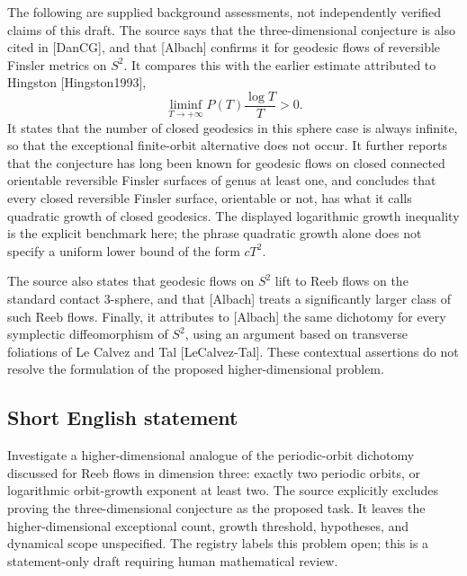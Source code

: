 \documentclass[11pt]{article}
\begin{document}
The following are supplied background assessments, not independently verified claims of this draft. The source says that the three-dimensional conjecture is also cited in [DanCG], and that [Albach] confirms it for geodesic flows of reversible Finsler metrics on \(S^2\). It compares this with the earlier estimate attributed to Hingston [Hingston1993],
\[
\liminf_{T\to+\infty}P(T)\frac{\log T}{T}>0.
\]
It states that the number of closed geodesics in this sphere case is always infinite, so that the exceptional finite-orbit alternative does not occur. It further reports that the conjecture has long been known for geodesic flows on closed connected orientable reversible Finsler surfaces of genus at least one, and concludes that every closed reversible Finsler surface, orientable or not, has what it calls quadratic growth of closed geodesics. The displayed logarithmic growth inequality is the explicit benchmark here; the phrase quadratic growth alone does not specify a uniform lower bound of the form \(cT^2\).

The source also states that geodesic flows on \(S^2\) lift to Reeb flows on the standard contact \(3\)-sphere, and that [Albach] treats a significantly larger class of such Reeb flows. Finally, it attributes to [Albach] the same dichotomy for every symplectic diffeomorphism of \(S^2\), using an argument based on transverse foliations of Le Calvez and Tal [LeCalvez-Tal]. These contextual assertions do not resolve the formulation of the proposed higher-dimensional problem.
\subsection{Short English statement}
Investigate a higher-dimensional analogue of the periodic-orbit dichotomy discussed for Reeb flows in dimension three: exactly two periodic orbits, or logarithmic orbit-growth exponent at least two. The source explicitly excludes proving the three-dimensional conjecture as the proposed task. It leaves the higher-dimensional exceptional count, growth threshold, hypotheses, and dynamical scope unspecified. The registry labels this problem open; this is a statement-only draft requiring human mathematical review.
\end{document}
